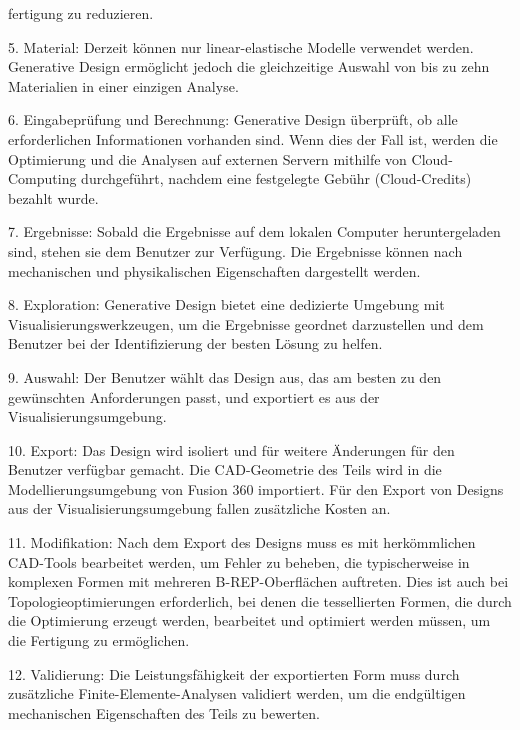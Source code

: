 fertigung zu reduzieren.

5. Material: Derzeit können nur linear-elastische Modelle verwendet werden. Generative Design ermöglicht jedoch die gleichzeitige Auswahl von bis zu zehn Materialien in einer einzigen Analyse.

6. Eingabeprüfung und Berechnung: Generative Design überprüft, ob alle erforderlichen Informationen vorhanden sind. Wenn dies der Fall ist, werden die Optimierung und die Analysen auf externen Servern mithilfe von Cloud-Computing durchgeführt, nachdem eine festgelegte Gebühr (Cloud-Credits) bezahlt wurde.

7. Ergebnisse: Sobald die Ergebnisse auf dem lokalen Computer heruntergeladen sind, stehen sie dem Benutzer zur Verfügung. Die Ergebnisse können nach mechanischen und physikalischen Eigenschaften dargestellt werden.

8. Exploration: Generative Design bietet eine dedizierte Umgebung mit Visualisierungswerkzeugen, um die Ergebnisse geordnet darzustellen und dem Benutzer bei der Identifizierung der besten Lösung zu helfen.

9. Auswahl: Der Benutzer wählt das Design aus, das am besten zu den gewünschten Anforderungen passt, und exportiert es aus der Visualisierungsumgebung.

10. Export: Das Design wird isoliert und für weitere Änderungen für den Benutzer verfügbar gemacht. Die CAD-Geometrie des Teils wird in die Modellierungsumgebung von Fusion 360 importiert. Für den Export von Designs aus der Visualisierungsumgebung fallen zusätzliche Kosten an.

11. Modifikation: Nach dem Export des Designs muss es mit herkömmlichen CAD-Tools bearbeitet werden, um Fehler zu beheben, die typischerweise in komplexen Formen mit mehreren B-REP-Oberflächen auftreten. Dies ist auch bei Topologieoptimierungen erforderlich, bei denen die tessellierten Formen, die durch die Optimierung erzeugt werden, bearbeitet und optimiert werden müssen, um die Fertigung zu ermöglichen.

12. Validierung: Die Leistungsfähigkeit der exportierten Form muss durch zusätzliche Finite-Elemente-Analysen validiert werden, um die endgültigen mechanischen Eigenschaften des Teils zu bewerten.